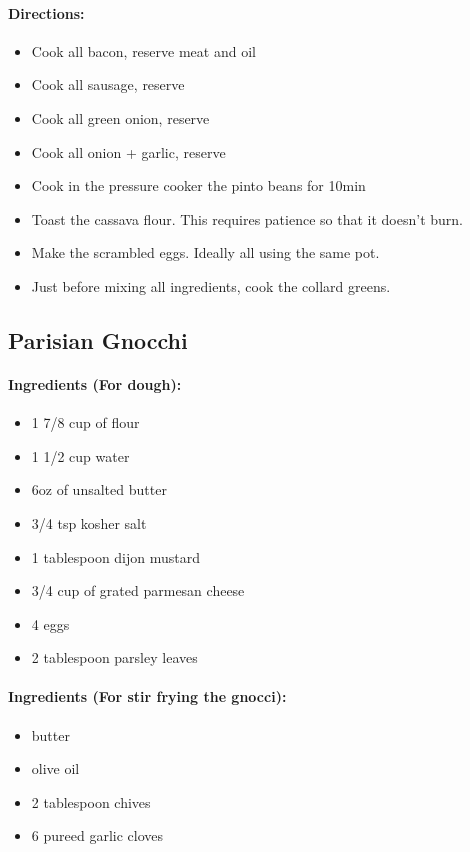 \documentclass{article}
\begin{document}
\paragraph{Directions:}
\begin{itemize}
    \item Cook all bacon, reserve meat and oil
    \item Cook all sausage, reserve
    \item Cook all green onion, reserve
    \item Cook all onion + garlic, reserve
    \item Cook in the pressure cooker the pinto beans for 10min
    \item Toast the cassava flour. This requires patience so that it doesn't burn.
    \item Make the scrambled eggs. Ideally all using the same pot.
    \item Just before mixing all ingredients, cook the collard greens.
\end{itemize}

\subsection{Parisian Gnocchi} 

\paragraph{Ingredients (For dough):}
\begin{itemize}
    \item 1 7/8 cup of flour
    \item 1 1/2 cup water
    \item 6oz of unsalted butter
    \item 3/4 tsp kosher salt
    \item 1 tablespoon dijon mustard
    \item 3/4 cup of grated parmesan cheese
    \item 4 eggs
    \item 2 tablespoon parsley leaves
\end{itemize}  

\paragraph{Ingredients (For stir frying the gnocci):}
\begin{itemize}
    \item butter
    \item olive oil
    \item 2 tablespoon chives
    \item 6 pureed garlic cloves
\end{itemize}  
\end{document}

